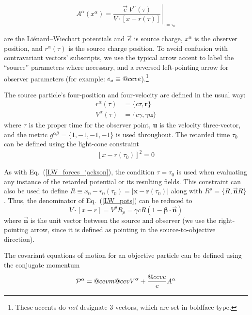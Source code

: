 \documentclass[reprint,
               amsmath,amssymb,nofootinbib, aps%
              ]{revtex4-2}
\makeatletter
\DeclareRobustCommand{\cev}[1]{%
  {\mathpalette\do@cev{#1}}%
}
\newcommand{\do@cev}[2]{%
  \vbox{\offinterlineskip
    \sbox\z@{$\m@th#1 x$}%
    \ialign{##\cr
      \hidewidth\reflectbox{$\m@th#1\vec{}\mkern4mu$}\hidewidth\cr
      \noalign{\kern-\ht\z@}
      $\m@th#1#2$\cr
    }%
  }%
}
\makeatother
\begin{document}
\begin{equation}
A^{\alpha}(x^\alpha)=\left.\frac{\vec{e}~V^{\alpha}(\tau)}{V \cdot[x-r(\tau)]}\right|_{\tau=\tau_{0}}
\label{LW_pots}
\end{equation}

\noindent are the Liénard--Wiechart potentials and $\vec{e}$ is source charge, $x^\alpha$ is the observer position, and $r^\alpha(\tau)$ is the source charge position. To avoid confusion with contravariant vectors' subscripts, we use the typical arrow accent to label the ``source'' parameters where necessary, and a reversed left-pointing arrow for observer parameters (for example: $e_o\equiv\cev{e}$).\footnote{These accents do \textit{not} designate 3-vectors, which are set in boldface type.}

The source particle's four-position and four-velocity are defined in the usual way:
\begin{align}
    r^\alpha(\tau) &= \{c\tau,\boldsymbol{r}\}
    \nonumber \\
    V^\alpha(\tau) &= \{c\gamma,\gamma\boldsymbol{u}\}
\end{align}
where $\tau$ is the proper time for the observer point, \textbf{u} is the velocity three-vector, and the metric $g^{\alpha \beta}=\{1, -1, -1, -1\}$ is used throughout. The retarded time $\tau_0$ can be defined using the light-cone constraint
\begin{align*}
    \left[x-r(\tau_0)\right]^2 = 0
\end{align*}

As with Eq.~(\ref{LW_forces_jackson}), the condition $\tau=\tau_0$ is used when evaluating any instance of the retarded potential or its resulting fields. This constraint can also be used to define $R\equiv x_0-r_0(\tau_0)=|\boldsymbol{x}-\boldsymbol{r}(\tau_0)|$ along with $R^\rho=\{R,\vec{\textbf{n}} R\}$. Thus, the denominator of Eq.~(\ref{LW_pots}) can be reduced to
\begin{equation}
    V\cdot [x-r] = V^\rho R_\rho =  \gamma c R(1-\boldsymbol{\beta}\cdot \vec{\textbf{n}})
\end{equation}
where $\vec{\textbf{n}}$ is the unit vector between the source and observer (we use the right-pointing arrow, since it is defined as pointing in the source-to-objective direction).

The covariant equations of motion for an objective particle can be defined using the conjugate momentum
\vspace{0.2cm}
\begin{equation}
    \mathcal{P}^\alpha = \cev{m} \cev{V}^\alpha + \frac{\cev{e}}{c}A^\alpha
    \label{mom_conj}
\end{equation}
\end{document}
